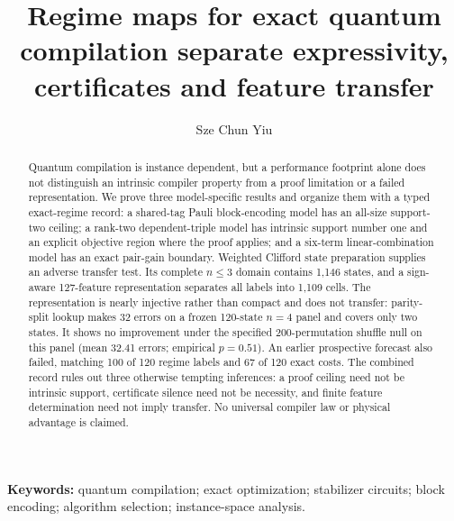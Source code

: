 \documentclass[a4paper,twocolumn,11pt,unpublished]{quantumarticle}
\theoremstyle{definition}
\begin{document}
\title{Regime maps for exact quantum compilation separate expressivity, certificates and feature transfer}
\author{Sze Chun Yiu}
\maketitle

\begin{abstract}
Quantum compilation is instance dependent, but a performance footprint alone does not distinguish an intrinsic compiler property from a proof limitation or a failed representation.  We prove three model-specific results and organize them with a typed exact-regime record: a shared-tag Pauli block-encoding model has an all-size support-two ceiling; a rank-two dependent-triple model has intrinsic support number one and an explicit objective region where the proof applies; and a six-term linear-combination model has an exact pair-gain boundary.  Weighted Clifford state preparation supplies an adverse transfer test.  Its complete $n\leq3$ domain contains 1,146 states, and a sign-aware 127-feature representation separates all labels into 1,109 cells.  The representation is nearly injective rather than compact and does not transfer: parity-split lookup makes 32 errors on a frozen 120-state $n=4$ panel and covers only two states.  It shows no improvement under the specified 200-permutation shuffle null on this panel (mean 32.41 errors; empirical $p=0.51$).  An earlier prospective forecast also failed, matching 100 of 120 regime labels and 67 of 120 exact costs.  The combined record rules out three otherwise tempting inferences: a proof ceiling need not be intrinsic support, certificate silence need not be necessity, and finite feature determination need not imply transfer.  No universal compiler law or physical advantage is claimed.
\end{abstract}

\noindent\textbf{Keywords:} quantum compilation; exact optimization; stabilizer circuits; block encoding; algorithm selection; instance-space analysis.












\balance


\end{document}
